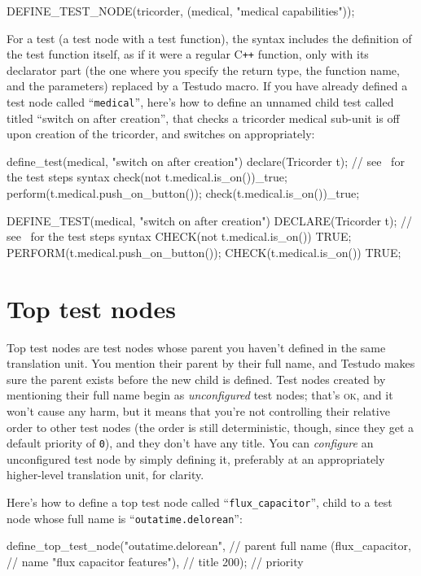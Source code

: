 \documentclass[twoside, a4paper, article]{memoir}
\newcommand*\Cpp{C\texttt{++}}
\begin{document}
\begin{cpplisting}
DEFINE_TEST_NODE(tricorder,
                 (medical, "medical capabilities"));
\end{cpplisting}

For a test (a test node with a test function), the syntax includes the
definition of the test function itself, as if it were a regular \Cpp{}
function, only with its declarator part (the one where you specify the return
type, the function name, and the parameters) replaced by a Testudo macro.  If
you have already defined a test node called ``\texttt{medical}'', here's how to
define an unnamed child test called titled ``switch on after creation'', that
checks a tricorder medical sub-unit is off upon creation of the tricorder, and
switches on appropriately:
\begin{cpplisting}
define_test(medical, "switch on after creation") {
  declare(Tricorder t); // see~ for the test steps syntax
  check(not t.medical.is_on())_true;
  perform(t.medical.push_on_button());
  check(t.medical.is_on())_true;
}
\end{cpplisting}

\begin{cpplisting}
DEFINE_TEST(medical, "switch on after creation")
{
  DECLARE(Tricorder t); // see~ for the test steps syntax
  CHECK(not t.medical.is_on()) TRUE;
  PERFORM(t.medical.push_on_button());
  CHECK(t.medical.is_on()) TRUE;
}
\end{cpplisting}

\section{Top test nodes}
\label{sec:top-test-nodes}

Top test nodes are test nodes whose parent you haven't defined in the same
translation unit.  You mention their parent by their full name, and Testudo
makes sure the parent exists before the new child is defined.  Test nodes
created by mentioning their full name begin as \emph{unconfigured} test nodes;
that's \textsc{ok}, and it won't cause any harm, but it means that you're not
controlling their relative order to other test nodes (the order is still
deterministic, though, since they get a default priority of \texttt{0}), and
they don't have any title.  You can \emph{configure} an unconfigured test node
by simply defining it, preferably at an appropriately higher-level translation
unit, for clarity.

Here's how to define a top test node called ``\texttt{flux\_capacitor}'', child
to a test node whose full name is ``\texttt{outatime.delorean}'':
\begin{cpplisting}
define_top_test_node("outatime.delorean", // parent full name
                     (flux_capacitor, // name
                      "flux capacitor features"), // title
                     200); // priority
\end{cpplisting}
\end{document}
